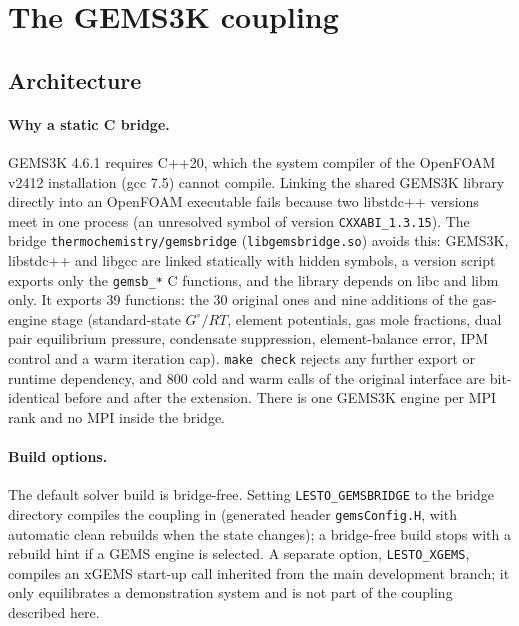 \documentclass[11pt,a4paper]{article}
\begin{document}
\section{The GEMS3K coupling}
\label{sec:coupling}

\subsection{Architecture}

\paragraph{Why a static C bridge.} GEMS3K 4.6.1 requires C++20, which the
system compiler of the OpenFOAM v2412 installation (gcc 7.5) cannot
compile. Linking the shared GEMS3K library directly into an OpenFOAM
executable fails because two libstdc++ versions meet in one process
(an unresolved symbol of version \texttt{CXXABI\_1.3.15}). The bridge
\texttt{thermochemistry/gemsbridge} (\texttt{libgemsbridge.so}) avoids
this: GEMS3K, libstdc++ and libgcc are linked statically with hidden
symbols, a version script exports only the \texttt{gemsb\_*} C
functions, and the library depends on libc and libm only. It exports 39
functions: the 30 original ones and nine additions of the gas-engine
stage (standard-state $G^\circ/RT$, element potentials, gas mole
fractions, dual pair equilibrium pressure, condensate suppression,
element-balance error, IPM control and a warm iteration cap).
\texttt{make check} rejects any further export or runtime dependency,
and 800 cold and warm calls of the original interface are bit-identical
before and after the extension. There is one GEMS3K engine per MPI rank
and no MPI inside the bridge.

\paragraph{Build options.} The default solver build is bridge-free.
Setting \texttt{LESTO\_GEMSBRIDGE} to the bridge directory compiles the
coupling in (generated header \texttt{gemsConfig.H}, with automatic
clean rebuilds when the state changes); a bridge-free build stops with a
rebuild hint if a GEMS engine is selected. A separate option,
\texttt{LESTO\_XGEMS}, compiles an xGEMS start-up call inherited from the
main development branch; it only equilibrates a demonstration system
and is not part of the coupling described here.
\end{document}
